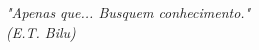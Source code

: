 \begin{epigrafe}
    \vspace*{\fill}
	\begin{flushright}
		\textit{"Apenas que... Busquem conhecimento." \\
		(E.T. Bilu)}
	\end{flushright}
\end{epigrafe}
